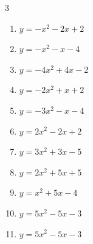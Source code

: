 \begin{multicols}{3}
\begin{enumerate}
  \item $\displaystyle y=-x^{2}-2x+2$

        \phantom{$\displaystyle 頂点\left( -1 , 3 \right)$}

  \item $\displaystyle y=-x^{2}-x-4$


  \item $\displaystyle y=-4x^{2}+4x-2$


\columnbreak %

\resetques

  \item $\displaystyle y=-2x^{2}+x+2$


  \item $\displaystyle y=-3x^{2}-x-4$


  \item $\displaystyle y=2x^{2}-2x+2$


  \item $\displaystyle y=3x^{2}+3x-5$


  \item $\displaystyle y=2x^{2}+5x+5$


\columnbreak %

  \item $\displaystyle y=x^{2}+5x-4$


  \item $\displaystyle y=5x^{2}-5x-3$


  \item $\displaystyle y=5x^{2}-5x-3$


\end{enumerate}
\end{multicols}

